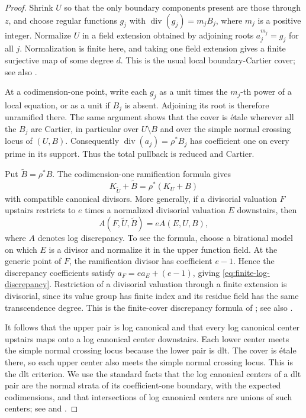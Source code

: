 \begin{proof}
Shrink $U$ so that the only boundary components present are those
through $z$, and choose regular functions $g_j$ with
$\operatorname{div}(g_j)=m_jB_j$, where $m_j$ is a positive integer.
Normalize $U$ in a field extension obtained by adjoining roots
$a_j^{m_j}=g_j$ for all $j$.  Normalization is finite here, and taking
one field extension gives a finite surjective map of some degree $d$.
This is the usual local boundary-Cartier cover; see also
\cite[Proposition~11.25]{Kollar2023Families}.

At a codimension-one point, write each $g_j$ as a unit times the
$m_j$-th power of a local equation, or as a unit if $B_j$ is absent.
Adjoining its root is therefore unramified there.  The same argument
shows that the cover is \'etale wherever all the $B_j$ are Cartier,
in particular over $U\setminus B$ and over the simple normal crossing
locus of $(U,B)$.  Consequently
$\operatorname{div}(a_j)=\rho^*B_j$ has coefficient one on every prime
in its support.  Thus the total pullback is reduced and Cartier.

Put $\widetilde B=\rho^*B$.  The codimension-one ramification formula
gives
\[
 K_{\widetilde U}+\widetilde B
   =\rho^*(K_U+B)
\]
with compatible canonical divisors.  More generally, if a divisorial
valuation $F$ upstairs restricts to $e$ times a normalized divisorial
valuation $E$ downstairs, then
\begin{equation}
\label{eq:finite-log-discrepancy}
 A(F,\widetilde U,\widetilde B)=eA(E,U,B),
\end{equation}
where $A$ denotes log discrepancy.  To see the formula, choose a
birational model on which $E$ is a divisor and normalize it in the
upper function field.  At the generic point of $F$, the ramification
divisor has coefficient $e-1$.  Hence the discrepancy coefficients
satisfy $a_F=e a_E+(e-1)$, giving
\eqref{eq:finite-log-discrepancy}.  Restriction of a divisorial
valuation through a finite extension is divisorial, since its value
group has finite index and its residue field has the same
transcendence degree.  This is the finite-cover discrepancy formula
of \cite[Proposition~5.20]{KM1998}; see also
\cite[11.22--11.23]{Kollar2023Families}.

It follows that the upper pair is log canonical and that every log
canonical center upstairs maps onto a log canonical center downstairs.
Each lower center meets the simple normal crossing locus because the
lower pair is dlt.  The cover is \'etale there, so each upper center
also meets the simple normal crossing locus.  This is the dlt
criterion.  We use the standard facts that the log canonical centers
of a dlt pair are the normal strata of its coefficient-one boundary,
with the expected codimensions, and that intersections of log
canonical centers are unions of such centers; see
\cite[Proposition~9.2 in the author draft]{FujinoDlt} and
\cite[Definition~11.5 and~11.10]{Kollar2023Families}.


\end{proof}

